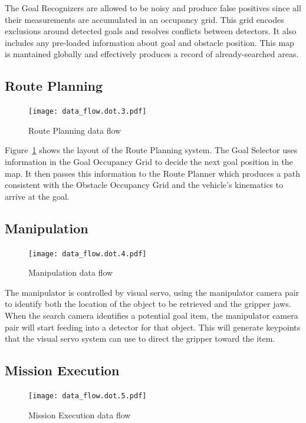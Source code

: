 \documentclass[12pt]{article}
\begin{document}
The Goal Recognizers are allowed to be noisy and produce false positives since all their measurements are accumulated in an occupancy grid. This grid encodes exclusions around detected goals and resolves conflicts between detectors. It also includes any pre-loaded information about goal and obstacle position. This map is mantained globally and effectively produces a record of already-searched areas.

\subsection{Route Planning}
\begin{figure}[htbp]
\centering
\texttt{[image: data\_flow.dot.3.pdf]}
\caption{Route Planning data flow}
\label{fig_df_rp}
\end{figure}
Figure~\ref{fig_df_rp} shows the layout of the Route Planning system. The Goal Selector uses information in the Goal Occupancy Grid to decide the next goal position in the map. It then passes this information to the Route Planner which produces a path consistent with the Obstacle Occupancy Grid and the vehicle's kinematics to arrive at the goal.


\subsection{Manipulation}\label{Manipulation}
\begin{figure}[htbp]
\centering
\texttt{[image: data\_flow.dot.4.pdf]}
\caption{Manipulation data flow}
\label{fig_df_man}
\end{figure}

The manipulator is controlled by visual servo, using the manipulator camera pair to identify both the location of the object to be retrieved and the gripper jaws. When the search camera identifies a potential goal item, the manipulator camera pair will start feeding into a detector for that object. This will generate keypoints that the visual servo system can use to direct the gripper toward the item.


\subsection{Mission Execution}\label{MissionExecution}
\begin{figure}[htbp]
\centering
\texttt{[image: data\_flow.dot.5.pdf]}
\caption{Mission Execution data flow}
\label{fig_df_exec}
\end{figure}
\end{document}
